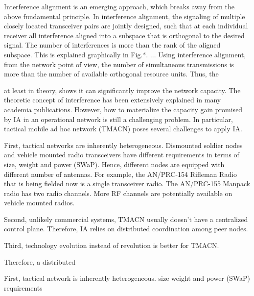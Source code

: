 \documentclass[letterpaper,11pt,onecolumn]{article}
\begin{document}
Interference alignment is an emerging approach, which breaks away from the above fundamental principle. In interference alignment, the signaling of multiple closely located transceiver pairs are jointly designed, such that at each individual receiver all interference aligned into a subspace that is orthogonal to the desired signal. The number of interferences is more than the rank of the aligned subspace. This is explained graphically in Fig.*. ... Using interference alignment, from the network point of view, the number of simultaneous transmissions is more than the number of available orthogonal resource units. Thus, the 

at least in theory, shows it can significantly improve the network capacity. The theoretic concept of interference has been extensively explained in many academia publications. However, how to materialize the capacity gain promised by IA in an operational network is still a challenging problem. In particular, tactical mobile ad hoc network (TMACN) poses several challenges to apply IA. 

First, tactical networks are inherently heterogeneous. Dismounted soldier nodes and vehicle mounted radio transceivers have different requirements in terms of size, weight and power (SWaP). Hence, different nodes are equipped with different number of antennas. For example, the AN/PRC-154 Rifleman Radio that is being fielded now is a single transceiver radio. The AN/PRC-155 Manpack radio has two radio channels. More RF channels are potentially  available on vehicle mounted radios. 

Second, unlikely commercial systems, TMACN usually doesn't have a centralized control plane. Therefore, IA relies on distributed coordination among peer nodes. 

Third,  technology evolution instead of revolution is better for TMACN.

Therefore, a distributed 

First, tactical network is inherently heterogeneous.  size weight and power (SWaP) requirements 




\end{document}
